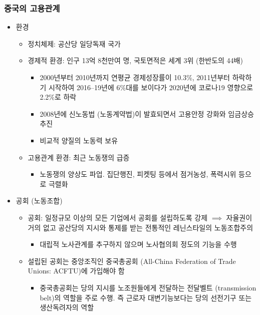 \documentclass[aspectratio=169,xcolor=dvipsnames,handout]{beamer}
\begin{document}
\begin{frame}[allowframebreaks]
    \frametitle{중국의 고용관계}
    \begin{itemize}[<+->]
        \item 환경
        \begin{itemize}
            \item 정치체제: 공산당 일당독재 국가
            \item 경제적 환경: 인구 13억 8천만여 명, 국토면적은 세계 3위 (한반도의 44배)
            \begin{itemize}
                \item 2000년부터 2010년까지 연평균 경제성장률이 10.3\%, 2011년부터 하락하기 시작하여 2016--19년에 6\%대를 보이다가 2020년에 코로나19 영향으로 2.2\%로 하락
                \item 2008년에 신노동법 (노동계약법)이 발효되면서 고용안정 강화와 임금상승 추진
                \item 비교적 양질의 노동력 보유 
            \end{itemize}
            \item 고용관계 환경: 최근 노동쟁의 급증
            \begin{itemize}
                \item 노동쟁의 양상도 파업. 집단행진, 피켓팅 등에서 점거농성, 폭력시위 등으로 극렬화
            \end{itemize}
        \end{itemize}
    \framebreak%
        \item 공회 (노동조합)
        \begin{itemize}
            \item 공회: 일정규모 이상의 모든 기업에서 공회를 설립하도록 강제 $\implies$ 자율권이 거의 없고 공산당의 지시와 통제를 받는 전통적인 레닌스타일의 노동조합주의
            \begin{itemize}
                    \item 대립적 노사관계를 추구하지 않으며 노사협의회 정도의 기능을 수행
            \end{itemize}
            \item 설립된 공회는 중앙조직인 중국총공회 (All-China Federation of Trade Unions: ACFTU)에 가입해야 함
            \begin{itemize}
                    \item 중국총공회는 당의 지시를 노조원들에게 전달하는 전달벨트 (transmission belt)의 역할을 주로 수행. 즉 근로자 대변기능보다는 당의 선전기구 또는 생산독려자의 역할
            \end{itemize}

\end{itemize}
\end{itemize}
\end{frame}
\end{document}
